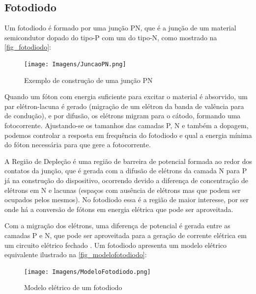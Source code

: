 \subsection{Fotodiodo}
\label{secao_fotodiodo}
Um fotodiodo \'e formado por uma junção PN, que \'e a junção de um material semicondutor dopado do tipo-P com um do tipo-N, como mostrado na \autoref{fig_fotodiodo}:

\begin{figure}[!h]
	\caption{\label{fig_fotodiodo}Exemplo de construção de uma junção PN}
	\begin{center}
	    \texttt{[image: Imagens/JuncaoPN.png]}
	\end{center}
\end{figure}

Quando um fóton com energia suficiente para excitar o material \'e absorvido, um par el\'etron-lacuna \'e gerado (migração de um el\'etron da banda de valência para de condução), e por difusão, os el\'etrons migram para o cátodo, formando uma fotocorrente. Ajustando-se os tamanhos das camadas P, N e também a dopagem, podemos controlar a resposta em frequência do fotodiodo e qual a energia mínima do fóton necessária para que gere a fotocorrente.

A Região de Depleção é uma região de barreira de potencial formada ao redor dos contatos da junção, que é gerada com a difusão de elétrons da camada N para P já na construção do dispositivo, ocorrendo devido a diferença de concentração de elétrons em N e lacunas (espaços com ausência de elétrons mas que podem ser ocupados pelos mesmos). No fotodiodo essa é a região de maior interesse, por ser onde há a conversão de fótons em energia elétrica que pode ser aproveitada.

Com a migração dos el\'etrons, uma diferença de potencial \'e gerada entre as camadas P e N, que pode ser aproveitada para a geração de corrente el\'etrica em um circuito el\'etrico fechado \cite{hamamatsu}.
Um fotodiodo apresenta um modelo el\'etrico equivalente ilustrado na \autoref{fig_modelofotodiodo}:

\begin{figure}[!h]
	\caption{\label{fig_modelofotodiodo}Modelo el\'etrico de um fotodiodo}
	\begin{center}
	    \texttt{[image: Imagens/ModeloFotodiodo.png]}
	\end{center}
	\label{modeloElFotodiodo}
\end{figure}

